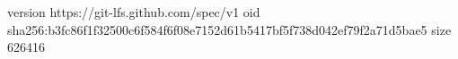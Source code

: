 version https://git-lfs.github.com/spec/v1
oid sha256:b3fc86f1f32500c6f584f6f08e7152d61b5417bf5f738d042ef79f2a71d5bae5
size 626416
